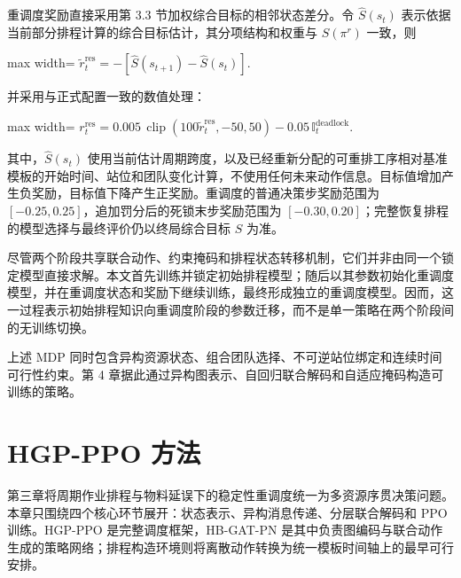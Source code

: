 \documentclass[journal,10pt]{IEEEtran}
\begin{document}
重调度奖励直接采用第 3.3 节加权综合目标的相邻状态差分。令 \(\widehat S(s_t)\) 表示依据当前部分排程计算的综合目标估计，其分项结构和权重与 \(S(\pi^r)\) 一致，则

\begin{center}
\begin{adjustbox}{max width=\columnwidth}
$\displaystyle
\widetilde r_t^{\mathrm{res}}=
-\left[\widehat S(s_{t+1})-\widehat S(s_t)\right].
$
\end{adjustbox}
\end{center}

并采用与正式配置一致的数值处理：

\begin{center}
\begin{adjustbox}{max width=\columnwidth}
$\displaystyle
r_t^{\mathrm{res}}=
0.005\,\operatorname{clip}
\left(100\widetilde r_t^{\mathrm{res}},-50,50\right)
-0.05\,\mathbb I_t^{\mathrm{deadlock}}.
$
\end{adjustbox}
\end{center}

其中，\(\widehat S(s_t)\) 使用当前估计周期跨度，以及已经重新分配的可重排工序相对基准模板的开始时间、站位和团队变化计算，不使用任何未来动作信息。目标值增加产生负奖励，目标值下降产生正奖励。重调度的普通决策步奖励范围为 \([-0.25,0.25]\)，追加罚分后的死锁末步奖励范围为 \([-0.30,0.20]\)；完整恢复排程的模型选择与最终评价仍以终局综合目标 \(S\) 为准。

尽管两个阶段共享联合动作、约束掩码和排程状态转移机制，它们并非由同一个锁定模型直接求解。本文首先训练并锁定初始排程模型；随后以其参数初始化重调度模型，并在重调度状态和奖励下继续训练，最终形成独立的重调度模型。因而，这一过程表示初始排程知识向重调度阶段的参数迁移，而不是单一策略在两个阶段间的无训练切换。

上述 MDP 同时包含异构资源状态、组合团队选择、不可逆站位绑定和连续时间可行性约束。第 4 章据此通过异构图表示、自回归联合解码和自适应掩码构造可训练的策略。

\section{HGP-PPO 方法}\label{hgp-ppo-ux65b9ux6cd5}

第三章将周期作业排程与物料延误下的稳定性重调度统一为多资源序贯决策问题。本章只围绕四个核心环节展开：状态表示、异构消息传递、分层联合解码和 PPO 训练。HGP-PPO 是完整调度框架，HB-GAT-PN 是其中负责图编码与联合动作生成的策略网络；排程构造环境则将离散动作转换为统一模板时间轴上的最早可行安排。
\end{document}
